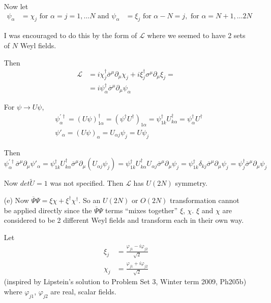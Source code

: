 \documentclass[twoside]{amsart}
\begin{document}
\begin{itemize}
Now let 
\[
\begin{aligned}
  \psi_{\alpha} & = \chi_j \text{ for } \alpha = j = 1, \dots N \text{ and } 
  \psi_{\alpha} & = \xi_j \text{ for } \alpha - N = j, \text{ for } \alpha = N+1, \dots 2N
\end{aligned}
\]

I was encouraged to do this by the form of $\mathcal{L}$ where we seemed to have 2 sets of $N$ Weyl fields.  

Then 
\[
\begin{aligned}
  \mathcal{L} & = i \chi_j^{\dag} \overline{\sigma}^{\mu} \partial_{\mu} \chi_j + i \xi^{\dag}_j \sigma^{\mu} \partial_{\mu} \xi_j = \\
  & = i \psi_{\alpha}^{\dag} \overline{\sigma}^{\mu} \partial_{\mu} \psi_{\alpha}
\end{aligned}
\]  

For $\psi \to U \psi$,
\[
\begin{aligned}
  & \psi^{'\dag}_{\alpha} = (U\psi)^{\dag}_{1\alpha} = (\psi^{\dag}U^{\dag})_{1\alpha} = \psi^{\dag}_{1k} U^{\dag}_{k\alpha} = \psi^{\dag}_{\alpha} U^{\dag} \\
  &  \psi'_{\alpha} = (U\psi)_{\alpha} = U_{\alpha j}\psi_j = U \psi_j
\end{aligned}
\]

Then 
\[
\psi_{\alpha}^{'\dag} \overline{\sigma}^{\mu} \partial_{\mu} \psi'_{\alpha} = \psi_{1k}^{\dag} U^{\dag}_{k\alpha} \overline{\sigma}^{\mu} \partial_{\mu} ( U_{\alpha j} \psi_j ) = \psi_{1k}^{\dag} U^{\dag}_{k\alpha} U_{\alpha j} \overline{\sigma}^{\mu} \partial_{\mu} \psi_j = \psi_{1k}^{\dag} \delta_{kj} \overline{ \sigma}^{\mu} \partial_{\mu} \psi_j = \psi^{\dag}_j \overline{\sigma}^{\mu} \partial_{\mu} \psi_j
\]

Now $det{\widetilde{U}} = 1$ was not specified.  Then $\mathcal{L}$ has $U(2N)$ symmetry.  

\item[(e)]
Now $\overline{\Psi} \Psi = \xi \chi + \xi^{\dag} \chi^{\dag}$.  So an $U(2N)$ or $O(2N)$ transformation cannot be applied directly since the $\overline{\Psi} \Psi$ terms ``mixes together'' $\xi$, $\chi$.  $\xi$ and $\chi$ are considered to be 2 different Weyl fields and transform each in their own way.  

Let
\[
\begin{aligned}
  \xi_j & = \frac{  \varphi_{j1} - i \varphi_{j2} }{\sqrt{2}} \\
  \chi_j & = \frac{ \varphi_{j1} + i \varphi_{j2} }{\sqrt{2}}
\end{aligned}
\]
(inspired by Lipstein's solution to Problem Set 3, Winter term 2009, Ph205b) where $\varphi_{j1}$, $\varphi_{j2}$ are real, scalar fields.  


\end{itemize}
\end{document}
